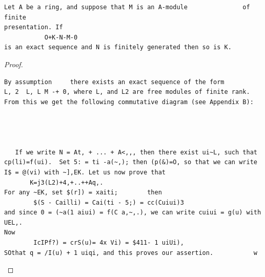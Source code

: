 \begin{theorem}\label{mcrt-auto-theorem-2-6}\uses{}
\begin{verbatim}
Let A be a ring, and suppose that M is an A-module               of finite
presentation. If
           O+K-N-M-0
is an exact sequence and N is finitely generated then so is K.
\end{verbatim}
\end{theorem}
\begin{proof}
\begin{verbatim}
By assumption     there exists an exact sequence of the form
L, 2  L, L M -+ 0, where L, and L2 are free modules of finite rank.
From this we get the following commutative diagram (see Appendix B):




   If we write N = At, + ... + A<,,, then there exist ui~L, such that
cp(li)=f(ui).  Set 5: = ti -a(~,); then (p(&)=O, so that we can write
I$ = @(vi) with ~],EK. Let us now prove that
       K=j3(L2)+4,+..++Aq,.
For any ~EK, set $(r]) = xaiti;        then
        $(S - Cailli) = Cai(ti - 5;) = cc(Cuiui)3
and since 0 = (~a(1 aiui) = f(C a,~,.), we can write cuiui = g(u) with UEL,.
Now
        IcIPf?) = crS(u)= 4x Vi) = $411- 1 uiUi),
SOthat q = /I(u) + 1 uiqi, and this proves our assertion.           w
\end{verbatim}
\end{proof}


